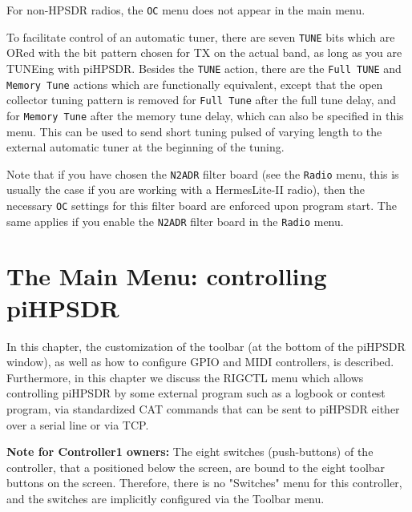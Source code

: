 \documentclass[12pt]{book}
\def\rett#1{\texttt{\color{red}#1}}
\def\bltt#1{\texttt{\color{blue}#1}}
\begin{document}
For non-HPSDR radios, the \bltt{OC} menu does not appear in the main menu.

To facilitate control of an automatic tuner, there are seven \rett{TUNE}
bits which are ORed with the bit pattern chosen for TX on the actual band,
as long as you are TUNEing with piHPSDR. Besides the \bltt{TUNE} action,
there are the \bltt{Full TUNE} and \bltt{Memory Tune} actions which are
functionally equivalent, except that the open collector tuning pattern
is removed for \bltt{Full Tune} after the full tune delay, and for \bltt{Memory Tune}
after the memory tune delay, which can also be specified in this menu.
This can be used to send short tuning pulsed of varying length to the
external automatic tuner at the beginning of the tuning.



Note that if you have chosen the \texttt{N2ADR} filter board (see the \bltt{Radio} menu,
this is usually the
case if you are working with a HermesLite-II radio), then the necessary \bltt{OC}
settings for this filter board are enforced upon program start. The same applies if
you enable the \texttt{N2ADR} filter board in the \bltt{Radio} menu.

\chapter{The Main Menu: controlling piHPSDR}

In this chapter, the customization of the toolbar (at the bottom of the piHPSDR window),
as well as how to configure GPIO and MIDI controllers, is described. Furthermore, in this
chapter we discuss the RIGCTL menu which allows controlling piHPSDR by some external program
such as a logbook or contest program, via standardized CAT commands that can be sent to
piHPSDR either over a serial line or via TCP.

\textbf{Note for Controller1 owners:} The eight switches (push-buttons) of the controller,
that a positioned below the screen, are bound to the eight toolbar buttons on the screen.
Therefore, there is no "Switches" menu for this controller, and the switches are implicitly
configured via the Toolbar menu.
\end{document}
